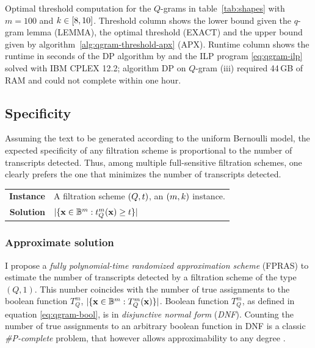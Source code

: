 \begin{table}[h]
\center
\caption[Optimal threshold computation results]{Optimal threshold computation for the $Q$-grams in table~\ref{tab:shapes} with $m=100$ and $k \in \left[8,10\right]$. Threshold column shows the lower bound given the $q$-gram lemma (LEMMA), the optimal threshold (EXACT) and the upper bound given by algorithm~\ref{alg:qgram-threshold-apx} (APX). Runtime column shows the runtime in seconds of the DP algorithm by \cite{Burkhardt2001} and the ILP program \ref{eq:qgram-ilp} solved with IBM CPLEX 12.2; algorithm DP on $Q$-gram (iii) required 44\,GB of RAM and could not complete within one hour.}
\sffamily
\renewcommand{\tabcolsep}{0.8ex}

\label{tab:threshold}
\end{table}

\subsection{Specificity}
\label{sub:qgram-specificity}

Assuming the text to be generated according to the uniform Bernoulli model, the expected specificity of any filtration scheme is proportional to the number of transcripts detected.
Thus, among multiple full-sensitive filtration schemes, one clearly prefers the one that minimizes the number of transcripts detected.

\begin{problem}
\begin{tabular}{rl}
{\bf Instance}	&	A filtration scheme $(Q,t)$, an $(m,k)$ instance.\\
{\bf Solution}	&	$| \{ \mathbf{x} \in \mathbb {B}^{m} : t_{Q}^{m}(\mathbf{x}) \geq t \} |$
\end{tabular}
\end{problem}

\subsubsection{Approximate solution}

I propose a \emph{fully polynomial-time randomized approximation scheme} (FPRAS) \citep{Vazirani2001} to estimate the number of transcripts detected by a filtration scheme of the type $(Q,1)$.
This number coincides with the number of true assignments to the boolean function $T_{Q}^{m}$, \ie $| \{ \mathbf{x} \in \mathbb {B}^{m} : T_{Q}^{m}(\mathbf{x}) \} |$.
Boolean function $T_{Q}^{m}$, as defined in equation \ref{eq:qgram-bool}, is in \emph{disjunctive normal form} (\emph{DNF}).
Counting the number of true assignments to an arbitrary boolean function in DNF is a classic \emph{\#P-complete} problem, that however allows approximability to any degree \citep{Vazirani2001}.

